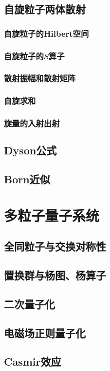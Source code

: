 \documentclass[a4paper,11pt]{book}
\begin{document}
\section{自旋粒子两体散射}
\subsection{自旋粒子的Hilbert空间}
\subsection{自旋粒子的$S$算子}
\subsection{散射振幅和散射矩阵}
\subsection{自旋求和}
\subsection{旋量的入射出射}
\section{Dyson公式}
\section{Born近似}
\chapter{多粒子量子系统}
\section{全同粒子与交换对称性}
\section{置换群与杨图、杨算子}
\section{二次量子化}

\section{电磁场正则量子化}
\section{Casmir效应}
\end{document}
